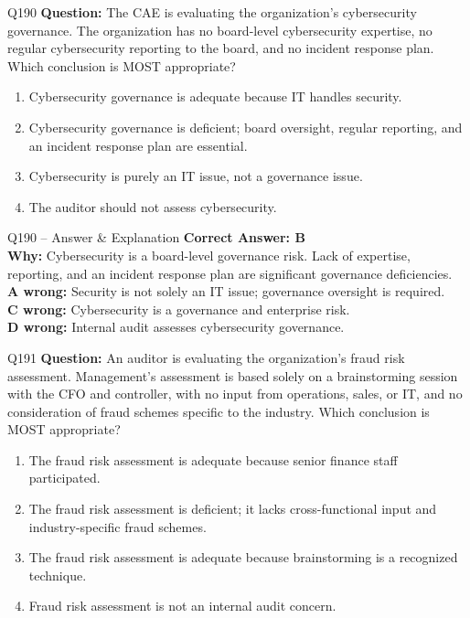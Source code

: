 \documentclass[aspectratio=169,10pt]{beamer}
\begin{document}
	\begin{frame}[t]{Q190}
		\small
		\textbf{Question:} The CAE is evaluating the organization's cybersecurity governance. The organization has no board-level cybersecurity expertise, no regular cybersecurity reporting to the board, and no incident response plan. Which conclusion is MOST appropriate?
		\begin{enumerate}[label=\Alph*.,itemsep=1pt,topsep=2pt]
			\item Cybersecurity governance is adequate because IT handles security.
			\item Cybersecurity governance is deficient; board oversight, regular reporting, and an incident response plan are essential.
			\item Cybersecurity is purely an IT issue, not a governance issue.
			\item The auditor should not assess cybersecurity.
		\end{enumerate}
	\end{frame}
	
	\begin{frame}[t]{Q190 -- Answer \& Explanation}
		\small
		\textbf{Correct Answer: B} \\[4pt]
		\textbf{Why:} Cybersecurity is a board-level governance risk. Lack of expertise, reporting, and an incident response plan are significant governance deficiencies. \\[4pt]
		\textbf{A wrong:} Security is not solely an IT issue; governance oversight is required. \\[2pt]
		\textbf{C wrong:} Cybersecurity is a governance and enterprise risk. \\[2pt]
		\textbf{D wrong:} Internal audit assesses cybersecurity governance.
	\end{frame}
	
	\begin{frame}[t]{Q191}
		\small
		\textbf{Question:} An auditor is evaluating the organization's fraud risk assessment. Management's assessment is based solely on a brainstorming session with the CFO and controller, with no input from operations, sales, or IT, and no consideration of fraud schemes specific to the industry. Which conclusion is MOST appropriate?
		\begin{enumerate}[label=\Alph*.,itemsep=1pt,topsep=2pt]
			\item The fraud risk assessment is adequate because senior finance staff participated.
			\item The fraud risk assessment is deficient; it lacks cross-functional input and industry-specific fraud schemes.
			\item The fraud risk assessment is adequate because brainstorming is a recognized technique.
			\item Fraud risk assessment is not an internal audit concern.
		\end{enumerate}
	\end{frame}
	
\end{document}
